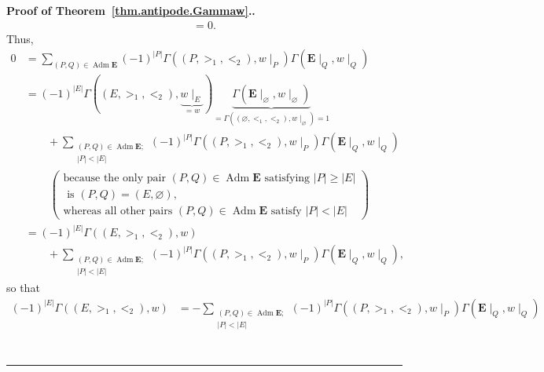 \documentclass[numbers=enddot,12pt,final,onecolumn,notitlepage,abstracton]{scrartcl}
\theoremstyle{definition}
\newenvironment{proof}[1][Proof]{\noindent\textbf{#1.} }{\ \rule{0.5em}{0.5em}}
\let\sumnonlimits\sum
\renewcommand{\sum}{\sumnonlimits\limits}
\newenvironment{verlong}{}{}
\newenvironment{vershort}{}{}
\newcommand{\Adm}{\operatorname{Adm}}
\newcommand{\EE}{{\mathbf{E}}}
\begin{document}
\begin{proof}[Proof of Theorem~\ref{thm.antipode.Gammaw}.]
\begin{verlong}
\begin{align*}
= 0.
\end{align*}
\end{verlong}
\begin{vershort}
Thus,
\begin{align*}
0 &= \sum_{\left(P, Q\right) \in \Adm \EE}
\left(-1\right)^{\left|P\right|}
\Gamma\left(\left(P, >_1, <_2\right), w\mid_P\right)
\Gamma\left(\EE\mid_Q, w\mid_Q\right) \\
&= \left(-1\right)^{\left|E\right|}
\Gamma\left(\left(E, >_1, <_2\right), \underbrace{w\mid_E}_{=w}\right)
\underbrace{\Gamma\left(\EE\mid_\varnothing, w\mid_\varnothing\right)
           }_{
           =\Gamma\left(\left(\varnothing, <_1, <_2\right), w\mid_\varnothing\right)
           =1}
\\
&\qquad + \sum_{\substack{\left(P, Q\right) \in \Adm \EE ; \\
                  \left|P\right| < \left|E\right|}}
\left(-1\right)^{\left|P\right|}
\Gamma\left(\left(P, >_1, <_2\right), w\mid_P\right)
\Gamma\left(\EE\mid_Q, w\mid_Q\right)
\\
& \ \ \ \ \ \ \ \ \ \ \left(
 \begin{array}{c}
  \text{because the only pair } \left(P, Q\right) \in \Adm \EE
  \text{ satisfying } \left|P\right| \geq \left|E\right| \\
  \text{ is } \left(P, Q\right) = \left(E, \varnothing\right)
  \text{,} \\
  \text{whereas all other pairs } \left(P, Q\right) \in \Adm \EE
  \text{ satisfy } \left|P\right| < \left|E\right|
 \end{array}
\right) \\
&= \left(-1\right)^{\left|E\right|} \Gamma\left(\left(E, >_1, <_2\right), w\right) \\
& \qquad
+ \sum_{\substack{\left(P, Q\right) \in \Adm \EE ; \\
                  \left|P\right| < \left|E\right|}}
\left(-1\right)^{\left|P\right|}
\Gamma\left(\left(P, >_1, <_2\right), w\mid_P\right)
\Gamma\left(\EE\mid_Q, w\mid_Q\right) ,
\end{align*}
so that
\begin{align*}
\left(-1\right)^{\left|E\right|} \Gamma\left(\left(E, >_1, <_2\right), w\right)
&= - \sum_{\substack{\left(P, Q\right) \in \Adm \EE ; \\
                  \left|P\right| < \left|E\right|}}
\left(-1\right)^{\left|P\right|}
\Gamma\left(\left(P, >_1, <_2\right), w\mid_P\right)
\Gamma\left(\EE\mid_Q, w\mid_Q\right) \\

\end{align*}
\end{vershort}
\end{proof}
\end{document}
